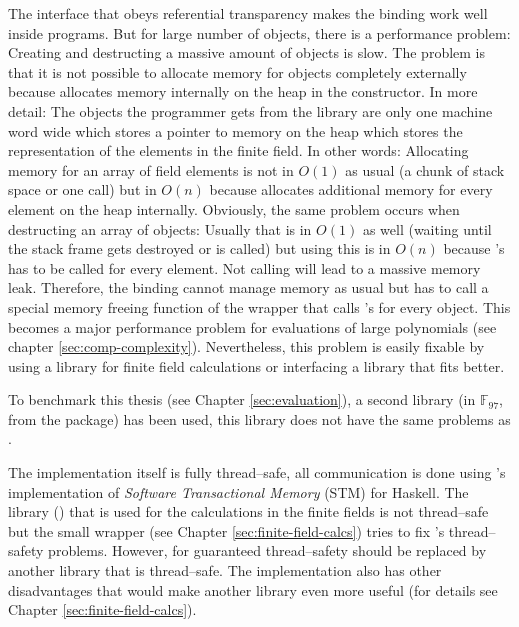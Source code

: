 The interface that obeys referential transparency makes the binding work well
inside \JWThaskell{} programs. But for large number of \JWTntl{} objects, there
is a performance problem: Creating and destructing a massive amount of objects
is slow. The problem is that it is not possible to allocate memory for \JWTntl{}
objects completely externally because \JWTntl{} allocates memory internally on
the heap in the constructor. In more detail: The objects the programmer gets
from the \JWTntl{} library are only one machine word wide which stores a pointer
to memory on the heap which stores the representation of the elements in the
finite field. In other words: Allocating memory for an array of field elements
is not in $O(1)$ as usual (a chunk of stack space or one  call)
but in $O(n)$ because \JWTntl{} allocates additional memory for every element on
the heap internally. Obviously, the same problem occurs when destructing an
array of \JWTntl{} objects: Usually that is in $O(1)$ as well (waiting until the
stack frame gets destroyed or  is called) but using \JWTntl{}
this is in $O(n)$ because \JWTcpp{}'s  has to be called for every
element. Not calling  will lead to a massive memory leak.
Therefore, the \JWThaskell{} binding cannot manage memory as usual but has to
call a special memory freeing function of the \JWTc{} wrapper that calls
\JWTcpp{}'s  for every object. This becomes a major performance
problem for evaluations of large polynomials (see chapter
\ref{sec:comp-complexity}). Nevertheless, this problem is easily fixable by
using a \JWThaskell{} library for finite field calculations or interfacing a
library that fits better.

To benchmark this thesis (see Chapter \ref{sec:evaluation}), a second library
(in $\mathbb{F}_{97}$, from the \JWTLhaskellForMaths{} package) has been used,
this library does not have the same problems as \JWTntl{}.



The implementation itself is fully thread--safe, all communication is done using
\JWTghc{}'s implementation of \emph{Software Transactional Memory} (STM)
\cite{stm05} for Haskell. The library (\JWTntl{}) that is used for the
calculations in the finite fields is not thread--safe but the small \JWTc{}
wrapper (see Chapter \ref{sec:finite-field-calcs}) tries to fix \JWTntl{}'s
thread--safety problems. However, for guaranteed thread--safety \JWTntl{} should
be replaced by another library that is thread--safe. The \JWTntl{}
implementation also has other disadvantages that would make another library even
more useful (for details see Chapter \ref{sec:finite-field-calcs}).


